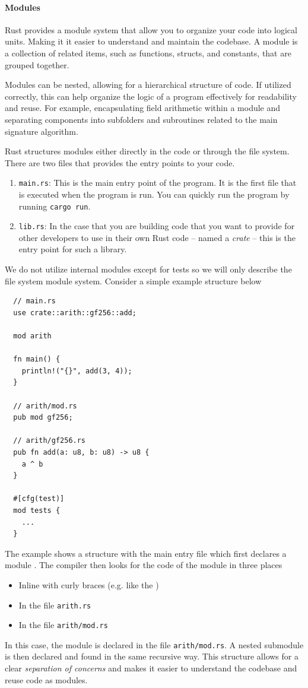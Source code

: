 \documentclass[11pt]{report}
\theoremstyle{definition}
\theoremstyle{plain}
\begin{document}
\paragraph{Modules}\label{sec:rust_modules}
Rust provides a module system that allow you to organize your code into logical units. Making it it easier to understand and maintain the codebase. A module is a collection of related items, such as functions, structs, and constants, that are grouped together.

Modules can be nested, allowing for a hierarchical structure of code.
If utilized correctly, this can help organize the logic of a program effectively for readability and reuse. For example, encapsulating field arithmetic within a module and separating components into subfolders and subroutines related to the main signature algorithm.

Rust structures modules either directly in the code or through the file system. There are two files that provides the entry points to your code.
\begin{enumerate}
  \item \texttt{main.rs}: This is the main entry point of the program. It is the first file that is executed when the program is run. You can quickly run the program by running \texttt{cargo run}.
  \item \texttt{lib.rs}: In the case that you are building code that you want to provide for other developers to use in their own Rust code -- named a \textit{crate} -- this is the entry point for such a library.
\end{enumerate}
We do not utilize internal modules except for tests so we will only describe the file system module system. Consider a simple example structure below
\begin{verbatim}
  // main.rs
  use crate::arith::gf256::add;

  mod arith

  fn main() {
    println!("{}", add(3, 4));
  }

  // arith/mod.rs
  pub mod gf256;

  // arith/gf256.rs
  pub fn add(a: u8, b: u8) -> u8 {
    a ^ b
  }

  #[cfg(test)]
  mod tests {
    ...
  }
\end{verbatim}
The example shows a structure with the main entry file which first declares a module . The compiler then looks for the code of the module in three places
\begin{itemize}[parsep=0pt, itemsep=0pt]
  \item Inline with curly braces (e.g. like the )
  \item In the file \texttt{arith.rs}
  \item In the file \texttt{arith/mod.rs}
\end{itemize}
In this case, the module  is declared in the file \texttt{arith/mod.rs}. A nested submodule  is then declared and found in the same recursive way. This structure allows for a clear \textit{separation of concerns} and makes it easier to understand the codebase and reuse code as modules.
\end{document}
